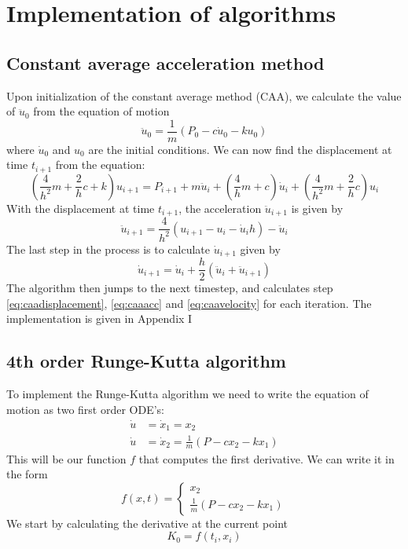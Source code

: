 \documentclass[11pt, a4paper, english]{NTNUoving}
\begin{document}
\section{Implementation of algorithms}
\subsection{Constant average acceleration method}
Upon initialization of the constant average method (CAA), we calculate the value of $\ddot{u}_0$ from the equation of motion
\begin{equation}
	\label{eq:eqnofmotion}
	\ddot{u}_0 = \frac{1}{m}(P_0 - c\dot{u}_0 - ku_0)
\end{equation}
where $\dot{u}_0$ and $u_0$ are the initial conditions. We can now find the displacement at time $t_{i+1}$ from the equation:
\begin{equation}
	\label{eq:caadisplacement}
	\left(\frac{4}{h^2} m + \frac{2}{h}c + k \right)u_{i+1} = P_{i+1} + m\ddot{u}_i + \left(\frac{4}{h}m + c \right) \dot{u}_i + \left(\frac{4}{h^2}m + \frac{2}{h}c\right)u_i
\end{equation}
With the displacement at time $t_{i+1}$, the acceleration $\ddot{u}_{i+1}$ is given by
\begin{equation}
	\label{eq:caaacc}
	\ddot{u}_{i+1} = \frac{4}{h^2}(u_{i+1} - u_i - \dot{u}_ih)-\ddot{u}_i
\end{equation} 
The last step in the process is to calculate $\dot{u}_{i+1}$ given by
\begin{equation}
	\label{eq:caavelocity}
	\dot{u}_{i+1} = \dot{u}_i + \frac{h}{2}(\ddot{u}_i + \ddot{u}_{i+1})
\end{equation}
The algorithm then jumps to the next timestep, and calculates step \eqref{eq:caadisplacement}, \eqref{eq:caaacc} and \eqref{eq:caavelocity} for each iteration. The implementation is given in Appendix I
\subsection{4th order Runge-Kutta algorithm}
To implement the Runge-Kutta algorithm we need to write the equation of motion as two first order ODE's:
\begin{align}
	\label{eq:firstorderode}
	\dot{u} &= \dot{x}_1 = x_2 \\
	\dot{u} &= \dot{x}_2 = \frac{1}{m}(P-cx_2-kx_1)
\end{align}
This will be our function $f$ that computes the first derivative. We can write it in the form
\begin{equation}
	f(x,t) = \begin{cases}
	x_2 \\
	\frac{1}{m}(P-cx_2-kx_1)
	\end{cases}
\end{equation}
We start by calculating the derivative at the current point
\begin{equation}
	K_0 = f(t_i,x_i)
\end{equation}
\end{document}
